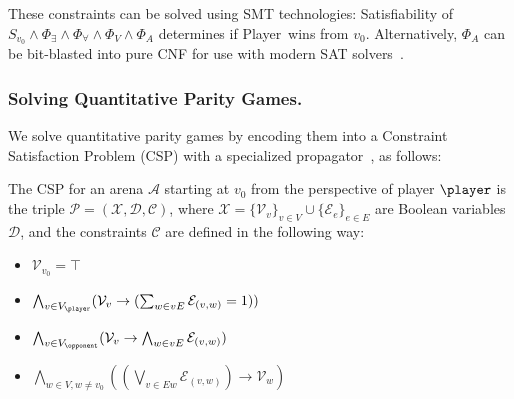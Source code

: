 \documentclass[runningheads]{llncs}
\begin{document}
These constraints can be solved using SMT technologies: Satisfiability of $S_{v_0} \wedge \Phi_\exists \wedge \Phi_\forall \wedge \Phi_V \wedge \Phi_A$ determines if Player~\even wins from $v_0$. Alternatively, $\Phi_A$ can be bit-blasted into pure CNF for use with modern SAT solvers~\cite{Heljanko:2012}.

\subsubsection{Solving Quantitative Parity Games.}
We solve quantitative parity games by encoding them into a Constraint Satisfaction Problem (CSP) with a specialized propagator~\cite{Hernandez:2026:noc}, as follows: 

\begin{definition}\label{def:csp}
    The CSP for an arena $\mathcal{A}$
    starting at $v_0$ from the perspective of player $\player$ is the triple $\mathcal{P} = (\mathcal{X}, \mathcal{D}, \mathcal{C})$, where $\mathcal{X} = \{ \mathcal{V}_v \}_{v \in V} \cup \{ \mathcal{E}_e \}_{e \in E}$ are Boolean variables $\mathcal{D}$, and the constraints $\mathcal{C}$ are defined in the following way:
    \begin{itemize}[leftmargin=2.1cm, labelwidth=1.7cm, align=left, itemsep=1.0ex, parsep=0pt]

        \item [$\mathcal{C}_{v_0}$ :] $\mathcal{V}_{v_0} = \top$

        \item [$\mathcal{C}_{\player}$ :] $\bigwedge_{v \in V_{\player}} (\mathcal{V}_v \rightarrow (\sum_{w \in vE} \mathcal{E}_{(v,w)}= 1))$

        \item [$\mathcal{C}_{\opponent}$ :] $\bigwedge_{v \in V_{\opponent}} (\mathcal{V}_v \rightarrow \bigwedge_{w \in vE} \mathcal{E}_{(v,w)})$

        \item [$\mathcal{C}_{\!E}$ :] $\bigwedge_{w \in V, w \neq v_0} ((\bigvee_{v \in Ew} \mathcal{E}_{(v,w)}) \rightarrow \mathcal{V}_w)$

        

\end{itemize}
\end{definition}
\end{document}
